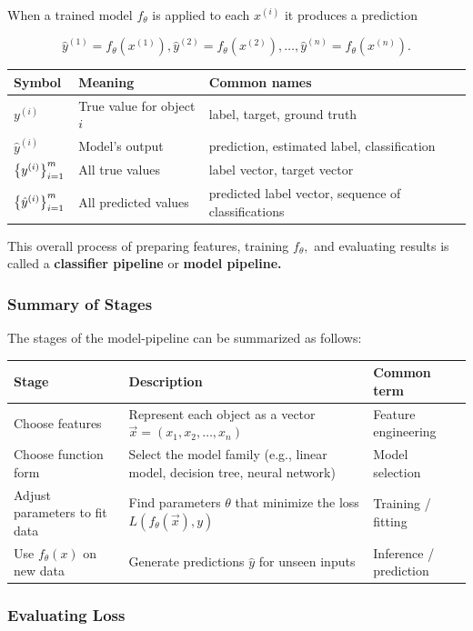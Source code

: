 \documentclass{article}
\begin{document}
When a trained model $f_\theta$ is applied to each $x^{(i)}$ it produces a \@{prediction}

\[ \hat{y}^{(1)} = f_\theta(x^{(1)}), \hat{y}^{(2)} = f_\theta(x^{(2)}), \dots, \hat{y}^{(n)} = f_\theta(x^{(n)}). \]

\begin{tabular}{lll}
Symbol & Meaning & Common names \\
\hline
$y^{(i)}$ & True value for object $i$ & label, target, ground truth \\
$\hat{y}^{(i)}$ & Model's output & prediction, estimated label, classification \\
$\left\{ y^{(i)} \right\}_{i=1}^m$ & All true values & label vector, target vector \\
$\left\{ \hat{y}^{(i)} \right\}_{i=1}^m$ & All predicted values & predicted label vector, sequence of classifications \\
\end{tabular}

\begin{definition}
This overall process of preparing features, training $f_\theta ,$ and evaluating results is called a \textbf{classifier pipeline} or \textbf{model pipeline.}
\end{definition}

\subsubsection{Summary of Stages}
The stages of the \@{model-pipeline} can be summarized as follows:

\begin{tabular}{lll}
Stage & Description & Common term \\
\hline
Choose features & Represent each object as a vector $\vec{x} = (x_1, x_2, \dots, x_n)$ & Feature engineering \\
Choose function form & Select the model family (e.g., linear model, decision tree, neural network) & Model selection \\
Adjust parameters to fit data & Find parameters $\theta$ that minimize the loss $L(f_\theta(\vec{x}), y)$ & Training / fitting \\
Use $f_\theta(x)$ on new data & Generate predictions $\hat{y}$ for unseen inputs & Inference / prediction \\
\end{tabular}

\subsubsection{Evaluating Loss}
\end{document}
